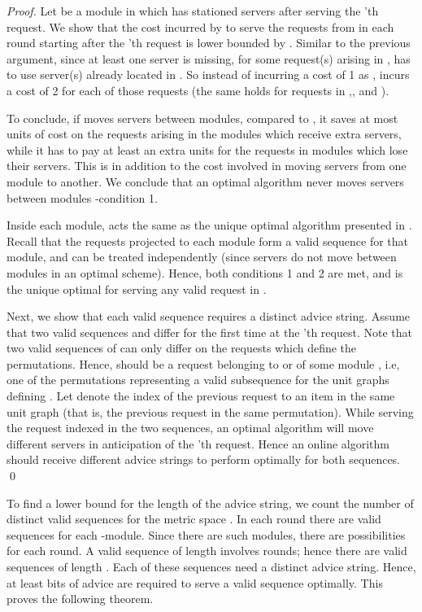 \begin{proof}
Let  be a  module in which \A has stationed  servers after serving the 'th request. We show that the cost incurred by \A to serve the requests from  in each round starting after the 'th request is lower bounded by . Similar to the previous argument, since at least one server is missing, for some request(s) arising in , \A has to use server(s) already located in . So instead of incurring a cost of 1 as \sol, \A incurs a cost of 2 for each of those requests (the same holds for requests in ,, and ).

To conclude, if \A moves  servers between modules, compared to \sol, it saves at most   units of cost on the requests arising in the modules which receive extra servers, while it has to pay at least an extra  units for the requests in modules which lose their servers. This is in addition to the cost involved in moving servers from one module to another. We conclude that an optimal algorithm never moves servers between modules -condition 1.  

Inside each module, \sol acts the same as the unique optimal algorithm presented in \cite{Bock11}. Recall that the requests projected to each module form a valid sequence for that module, and can be treated independently (since servers do not move between modules in an optimal scheme). Hence, both conditions 1 and 2 are met, and \sol is the unique optimal for 
serving any valid request in . 

Next, we show that each valid sequence requires a distinct advice string. Assume that two valid sequences  and  differ for the first time at the 'th request. Note that two valid sequences of  can only differ on the requests which define the permutations. Hence,  should be a request belonging to  or  of some module , i.e, one of the permutations representing a valid subsequence for the unit graphs defining . Let  denote the index of the previous request to an item in the same unit graph (that is, the previous request in the same permutation). While serving the request indexed  in the two sequences,  an optimal algorithm will move different servers in anticipation of the 'th request. Hence an online algorithm should receive different advice strings to perform optimally for both sequences. \qed 
\end{proof}

To find a lower bound for the length of the advice string, we count the number of distinct valid sequences for the metric space .
In each round there are  valid sequences for each -module. Since there are  such modules, there are  possibilities for each round. A valid sequence of length  involves  rounds; hence there are  valid sequences of length . Each of these sequences need a distinct advice string. Hence, at least  bits of advice are required to serve a valid sequence optimally. This proves the following theorem.

